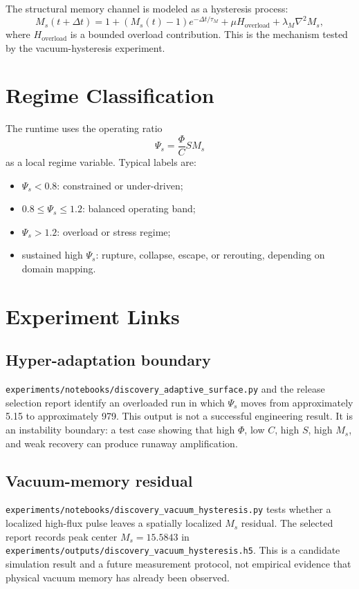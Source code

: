 \documentclass[12pt,a4paper]{article}
\begin{document}
The structural memory channel is modeled as a hysteresis process:
\begin{equation}
    M_s(t+\Delta t)
    =
    1 + (M_s(t)-1)e^{-\Delta t/\tau_M}
    + \mu H_{\mathrm{overload}}
    + \lambda_M \nabla^2 M_s,
\end{equation}
where $H_{\mathrm{overload}}$ is a bounded overload contribution. This is the
mechanism tested by the vacuum-hysteresis experiment.

\section{Regime Classification}
The runtime uses the operating ratio
\begin{equation}
    \Psi_s = \frac{\Phi}{C}S M_s
\end{equation}
as a local regime variable. Typical labels are:
\begin{itemize}
    \item $\Psi_s < 0.8$: constrained or under-driven;
    \item $0.8 \le \Psi_s \le 1.2$: balanced operating band;
    \item $\Psi_s > 1.2$: overload or stress regime;
    \item sustained high $\Psi_s$: rupture, collapse, escape, or rerouting,
    depending on domain mapping.
\end{itemize}

\section{Experiment Links}
\subsection{Hyper-adaptation boundary}
\texttt{experiments/notebooks/discovery\_adaptive\_surface.py} and the release
selection report identify an overloaded run in which $\Psi_s$ moves from
approximately 5.15 to approximately 979. This output is not a successful engineering result. It is an instability boundary: a test case
showing that high $\Phi$, low $C$, high $S$, high $M_s$, and weak recovery can
produce runaway amplification.

\subsection{Vacuum-memory residual}
\texttt{experiments/notebooks/discovery\_vacuum\_hysteresis.py} tests whether a
localized high-flux pulse leaves a spatially localized $M_s$ residual. The
selected report records peak center $M_s=15.5843$ in
\texttt{experiments/outputs/discovery\_vacuum\_hysteresis.h5}. This is a
candidate simulation result and a future measurement protocol, not empirical
evidence that physical vacuum memory has already been observed.
\end{document}
